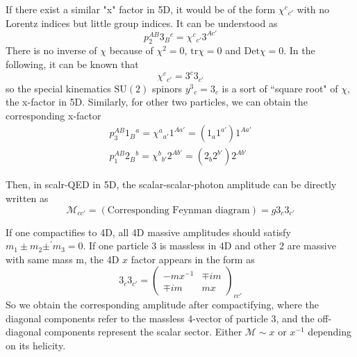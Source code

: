 \documentclass[12pt]{article}
\begin{document}
If there exist a similar "x" factor in 5D, it would be of the form $\chi^c{}_{c'}$ with no Lorentz indices but little group indices. It can be understood as
\begin{equation}
    p_2^{AB}3_B{}^c=\chi^c{}_{c'}3^{Ac'}
\end{equation}
There is no inverse of $\chi$ because of $\chi^2=0$, $\mathrm{tr} \chi =0$ and $\mathrm{Det}\chi = 0$. In the following, it can be known that 
\begin{equation}
    \chi^c{}_{c'}=3^c3_{c'}
\end{equation}
so the special kinematics $\mathrm{SU}(2)$ spinors $y^3{}_c=3_c$ is a sort of  ``square root" of $\chi$, the x-factor in 5D. Similarly, for other two particles, we can obtain the corresponding x-factor
\begin{gather}
    p_3^{AB}1_B{}^a=\chi^a{}_{a'}1^{Aa'}=(1_a1^{a'})1^{Aa'}\\
    p_1^{AB}2_B{}^b=\chi^b{}_{b'}2^{Ab'}=(2_b2^{b'})2^{Ab'}
\end{gather}

Then, in scalr-QED in 5D, the scalar-scalar-photon amplitude can be directly written as
\begin{equation}
    \mathcal{M}_{cc'}=(\text{Corresponding Feynman diagram})=g3_c3_{c'}
\end{equation}

If one compactifies to 4D, all 4D massive amplitudes should satisfy $m_1\pm m_2 \pm^{'}m_3=0$. If one particle 3 is massless in 4D and other 2 are massive with same mass m, the 4D $x$ factor appears in the form as
\begin{equation}
    3_c3_{c'}=\begin{pmatrix}
        -mx^{-1} & \mp im \\
        \mp im & mx
    \end{pmatrix}_{cc'}
\end{equation}
So we obtain the corresponding amplitude after compactifying, where the diagonal components refer to the massless 4-vector of particle 3, and the off-diagonal components represent the scalar sector. Either $\mathcal{M} \sim  x$ or $x^{-1}$ depending on its helicity.
\end{document}
